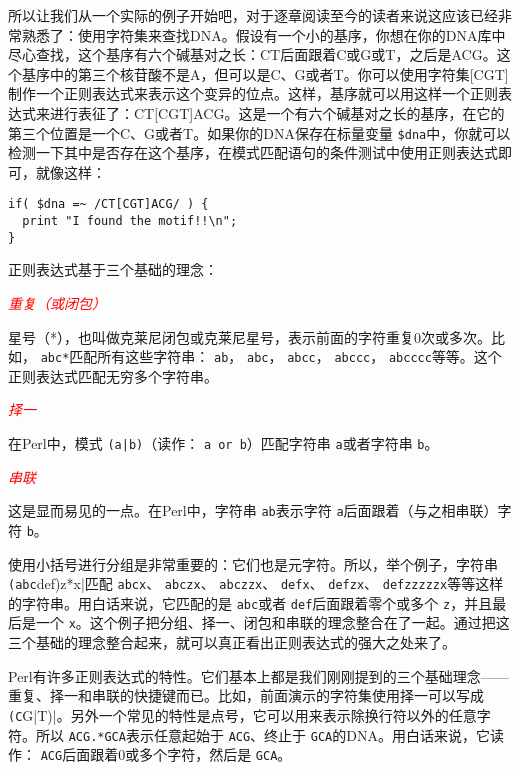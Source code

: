 所以让我们从一个实际的例子开始吧，对于逐章阅读至今的读者来说这应该已经非常熟悉了：使用字符集来查找DNA。假设有一个小的基序，你想在你的DNA库中尽心查找，这个基序有六个碱基对之长：CT后面跟着C或G或T，之后是ACG。这个基序中的第三个核苷酸不是A，但可以是C、G或者T。你可以使用字符集[CGT]制作一个正则表达式来表示这个变异的位点。这样，基序就可以用这样一个正则表达式来进行表征了：CT[CGT]ACG。这是一个有六个碱基对之长的基序，在它的第三个位置是一个C、G或者T。如果你的DNA保存在标量变量 \verb|$dna|中，你就可以检测一下其中是否存在这个基序，在模式匹配语句的条件测试中使用正则表达式即可，就像这样：

\begin{lstlisting}
if( $dna =~ /CT[CGT]ACG/ ) {
  print "I found the motif!!\n";
}
\end{lstlisting}

正则表达式基于三个基础的理念：

\textcolor{red}{\textit{重复（或闭包）}}
\begin{adjustwidth}{4em}{}
\hspace*{2em}星号（*），也叫做克莱尼闭包或克莱尼星号，表示前面的字符重复0次或多次。比如， \verb|abc*|匹配所有这些字符串： \verb|ab|， \verb|abc|， \verb|abcc|， \verb|abccc|， \verb|abcccc|等等。这个正则表达式匹配无穷多个字符串。
\end{adjustwidth}

\textcolor{red}{\textit{择一}}
\begin{adjustwidth}{4em}{}
\hspace*{2em}在Perl中，模式 \verb=(a|b)=（读作： \verb|a or b|）匹配字符串 \verb|a|或者字符串 \verb|b|。
\end{adjustwidth}

\textcolor{red}{\textit{串联}}
\begin{adjustwidth}{4em}{}
\hspace*{2em}这是显而易见的一点。在Perl中，字符串 \verb|ab|表示字符 \verb|a|后面跟着（与之相串联）字符 \verb|b|。
\end{adjustwidth}

使用小括号进行分组是非常重要的：它们也是元字符。所以，举个例子，字符串 \verb|(abc|def)z*x|匹配 \verb|abcx|、 \verb|abczx|、 \verb|abczzx|、 \verb|defx|、 \verb|defzx|、 \verb|defzzzzzx|等等这样的字符串。用白话来说，它匹配的是 \verb|abc|或者 \verb|def|后面跟着零个或多个 \verb|z|，并且最后是一个 \verb|x|。这个例子把分组、择一、闭包和串联的理念整合在了一起。通过把这三个基础的理念整合起来，就可以真正看出正则表达式的强大之处来了。

Perl有许多正则表达式的特性。它们基本上都是我们刚刚提到的三个基础理念——重复、择一和串联的快捷键而已。比如，前面演示的字符集使用择一可以写成 \verb|(C|G|T)|。另外一个常见的特性是点号，它可以用来表示除换行符以外的任意字符。所以 \verb|ACG.*GCA|表示任意起始于 \verb|ACG|、终止于 \verb|GCA|的DNA。用白话来说，它读作： \verb|ACG|后面跟着0或多个字符，然后是 \verb|GCA|。

